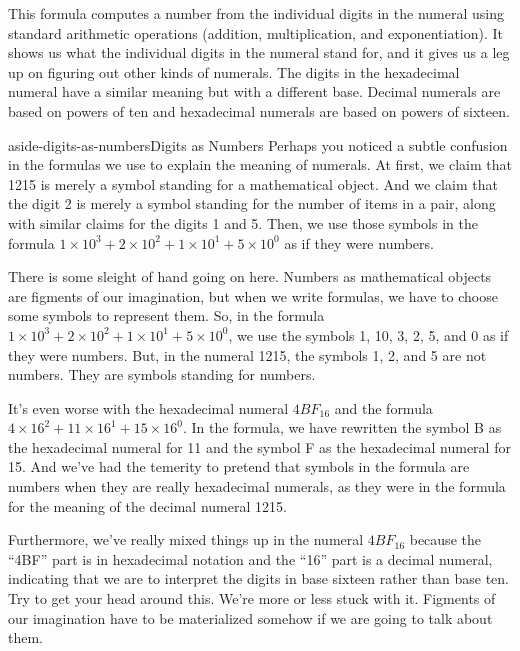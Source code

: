 This formula computes a number from the individual digits
in the numeral using standard arithmetic operations
(addition, multiplication, and exponentiation).
It shows us what the individual digits in the numeral stand for,
and it gives us a leg up on figuring out other kinds of numerals.
The digits in the hexadecimal numeral have a similar meaning
but with a different base. Decimal numerals are based on
powers of ten and hexadecimal numerals are based on powers of sixteen.

\begin{aside}{aside-digits-as-numbers}{Digits as Numbers}
Perhaps you noticed a subtle confusion in the formulas we use
to explain the meaning of numerals. At first, we claim that
1215 is merely a symbol standing for a mathematical object.
And we claim that the digit 2 is merely a symbol standing
for the number of items in a pair, along with similar
claims for the digits 1 and 5.
Then, we use those symbols in the formula
$1 \times 10^3 + 2 \times 10^2 + 1 \times 10^1 + 5 \times 10^0$
as if they were numbers.

There is some sleight of hand going on here.
Numbers as mathematical objects are figments of our imagination,
but when we write formulas, we have to choose some symbols to
represent them.
So, in the formula $1 \times 10^3 + 2 \times 10^2 + 1 \times 10^1 + 5 \times 10^0$,
we use the symbols 1, 10, 3, 2, 5, and 0 as if they were numbers.
But, in the numeral 1215, the symbols 1, 2, and 5 are not numbers.
They are symbols standing for numbers.

It's even worse with the hexadecimal numeral $4BF_{16}$
and the formula $4 \times 16^2 + 11 \times 16^1 + 15 \times 16^0$.
In the formula, we have rewritten the symbol B
as the hexadecimal numeral for 11
and the symbol F as the hexadecimal numeral for 15.
And we've had the temerity to pretend that symbols
in the formula are numbers when they are really hexadecimal numerals,
as they were in the formula for the meaning of the decimal numeral 1215.

Furthermore, we've really mixed things up in the numeral
$4BF_{16}$ because the ``4BF'' part is in hexadecimal notation
and the ``16'' part is a decimal numeral, indicating that we are
to interpret the digits in base sixteen rather than base ten.
Try to get your head around this.
We're more or less stuck with it. Figments of our imagination have
to be materialized somehow if we are going to talk about
them.
\end{aside}

